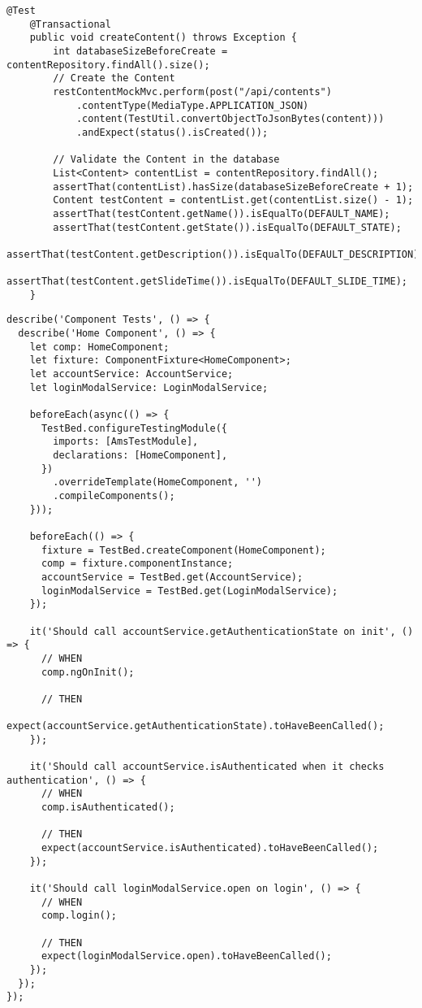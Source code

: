 \begin{lstlisting}[caption={Test di unità in Java},label={utj}]
    @Test
    @Transactional
    public void createContent() throws Exception {
        int databaseSizeBeforeCreate = contentRepository.findAll().size();
        // Create the Content
        restContentMockMvc.perform(post("/api/contents")
            .contentType(MediaType.APPLICATION_JSON)
            .content(TestUtil.convertObjectToJsonBytes(content)))
            .andExpect(status().isCreated());

        // Validate the Content in the database
        List<Content> contentList = contentRepository.findAll();
        assertThat(contentList).hasSize(databaseSizeBeforeCreate + 1);
        Content testContent = contentList.get(contentList.size() - 1);
        assertThat(testContent.getName()).isEqualTo(DEFAULT_NAME);
        assertThat(testContent.getState()).isEqualTo(DEFAULT_STATE);
        assertThat(testContent.getDescription()).isEqualTo(DEFAULT_DESCRIPTION);
        assertThat(testContent.getSlideTime()).isEqualTo(DEFAULT_SLIDE_TIME);
    }
\end{lstlisting}
\newpage
\begin{lstlisting}[caption={Test di unità in JavaScript},label={utj}]
    describe('Component Tests', () => {
  describe('Home Component', () => {
    let comp: HomeComponent;
    let fixture: ComponentFixture<HomeComponent>;
    let accountService: AccountService;
    let loginModalService: LoginModalService;

    beforeEach(async(() => {
      TestBed.configureTestingModule({
        imports: [AmsTestModule],
        declarations: [HomeComponent],
      })
        .overrideTemplate(HomeComponent, '')
        .compileComponents();
    }));

    beforeEach(() => {
      fixture = TestBed.createComponent(HomeComponent);
      comp = fixture.componentInstance;
      accountService = TestBed.get(AccountService);
      loginModalService = TestBed.get(LoginModalService);
    });

    it('Should call accountService.getAuthenticationState on init', () => {
      // WHEN
      comp.ngOnInit();

      // THEN
      expect(accountService.getAuthenticationState).toHaveBeenCalled();
    });

    it('Should call accountService.isAuthenticated when it checks authentication', () => {
      // WHEN
      comp.isAuthenticated();

      // THEN
      expect(accountService.isAuthenticated).toHaveBeenCalled();
    });

    it('Should call loginModalService.open on login', () => {
      // WHEN
      comp.login();

      // THEN
      expect(loginModalService.open).toHaveBeenCalled();
    });
  });
});
\end{lstlisting}

